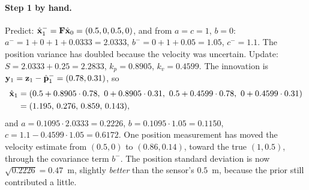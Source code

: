 \paragraph{Step 1 by hand.}
Predict: $\hat{\mathbf{x}}^-_1=\mathbf{F}\hat{\mathbf{x}}_0=(0.5,0,0.5,0)$, and from
$a=c=1$, $b=0$:
$a^-=1+0+1+0.0333=2.0333$, $b^-=0+1+0.05=1.05$, $c^-=1.1$. The position
variance has doubled because the velocity was uncertain. Update:
$S=2.0333+0.25=2.2833$, $k_p=0.8905$, $k_v=0.4599$. The innovation is
$\mathbf{y}_1=\mathbf{z}_1-\hat{\mathbf{p}}^-_1=(0.78,0.31)$, so
\begin{align*}
  \hat{\state}_1&=(0.5+0.8905\cdot0.78,\ 0+0.8905\cdot0.31,\ 0.5+0.4599\cdot0.78,\ 0+0.4599\cdot0.31)\\
  &=(1.195,\,0.276,\,0.859,\,0.143),
\end{align*}
and $a=0.1095\cdot2.0333=0.2226$, $b=0.1095\cdot1.05=0.1150$,
$c=1.1-0.4599\cdot1.05=0.6172$. One position measurement has moved the
velocity estimate from $(0.5,0)$ to $(0.86,0.14)$, toward the true
$(1,0.5)$, through the covariance term $b^-$. The position standard
deviation is now $\sqrt{0.2226}=0.47$~m, slightly \emph{better} than the
sensor's $0.5$~m, because the prior still contributed a little.

